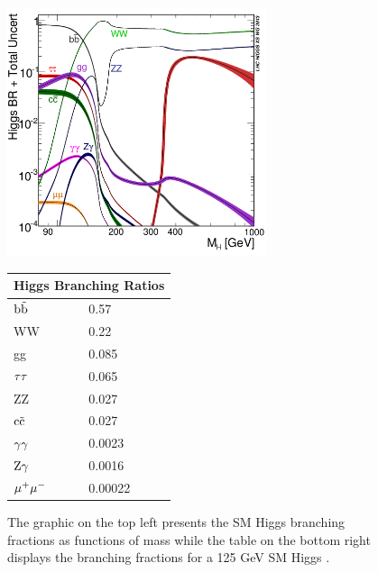 \begin{figure}[h!]
  \centering
  \includegraphics[width=3in]{images/Higgs_BR.png}
  \begin{tabular}{ |l|l| }
    \hline
    \multicolumn{2}{|c|}{Higgs Branching Ratios} \\
    \hline
    ${\rm b\tilde{b}}$ & 0.57 \\
    WW & 0.22\\
    gg & 0.085 \\
    ${\rm \tau\tau}$ & 0.065 \\
    ZZ & 0.027 \\
    ${\rm c\tilde{c}}$ & 0.027 \\
    ${\rm \gamma\gamma}$ & 0.0023 \\
    ${\rm Z}\gamma$ & 0.0016 \\
    ${\rm \mu^{+}\mu^{-}}$ & 0.00022 \\
    \hline
  \end{tabular} 
  \caption
{The graphic on the top left presents the SM Higgs branching fractions as functions of mass while the table on the bottom right displays the branching fractions for a 125 GeV SM Higgs \cite{crossbranchplots}.}
  \label{fig:hbranch}
\end{figure}

